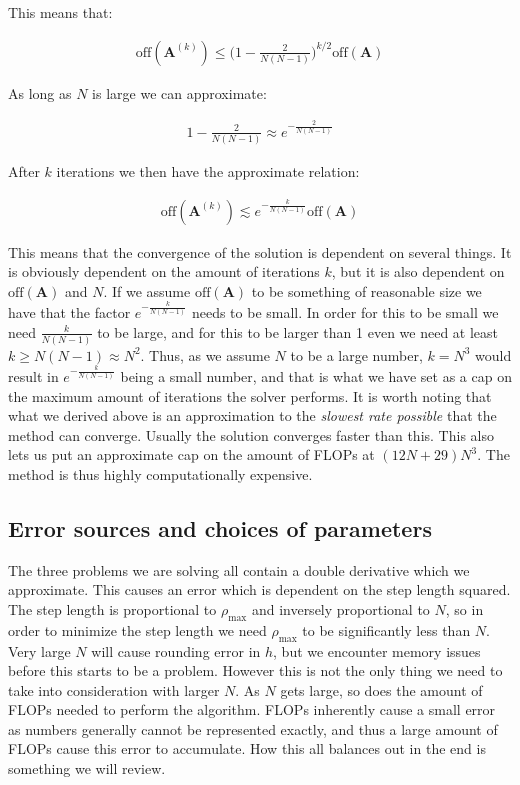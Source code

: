 \documentclass[reprint,english,notitlepage]{revtex4-1}  %
\begin{document}
This means that:

\begin{align*}
\text{off}(\textbf{A}^{(k)}) \leq \bigg(1 - \frac{2}{N(N-1)}\bigg)^{k/2} \text{off}(\textbf{A}) 
\end{align*}

As long as $N$ is large we can approximate:

\begin{align*}
1 - \frac{2}{N(N-1)} \approx e^{-\frac{2}{N(N-1)}}
\end{align*}

After $k$ iterations we then have the approximate relation:

\begin{align*}
\text{off}(\textbf{A}^{(k)}) \lesssim e^{-\frac{k}{N(N-1)}} \text{off}(\textbf{A}) 
\end{align*} 

This means that the convergence of the solution is dependent on several things. It is obviously dependent on the amount of iterations $k$, but it is also dependent on $\text{off}(\textbf{A})$ and $N$. If we assume $\text{off}(\textbf{A})$ to be something of reasonable size we have that the factor $e^{-\frac{k}{N(N-1)}}$ needs to be small. In order for this to be small we need $\frac{k}{N(N-1)}$ to be large, and for this to be larger than 1 even we need at least $k \geq N(N-1) \approx N^2$. Thus, as we assume $N$ to be a large number, $k = N^3$ would result in $e^{-\frac{k}{N(N-1)}}$ being a small number, and that is what we have set as a cap on the maximum amount of iterations the solver performs. It is worth noting that what we derived above is an approximation to the \textit{slowest rate possible} that the method can converge. Usually the solution converges faster than this. This also lets us put an approximate cap on the amount of FLOPs at $(12N + 29)N^3$. The method is thus highly computationally expensive. 


\subsection{Error sources and choices of parameters} \label{sec:III:b}

The three problems we are solving all contain a double derivative which we approximate. This causes an error which is dependent on the step length squared. The step length is proportional to $\rho_\text{max}$ and inversely proportional to $N$, so in order to minimize the step length we need $\rho_\text{max}$ to be significantly less than $N$. Very large $N$ will cause rounding error in $h$, but we encounter memory issues before this starts to be a problem. However this is not the only thing we need to take into consideration with larger $N$. As $N$ gets large, so does the amount of FLOPs needed to perform the algorithm. FLOPs inherently cause a small error as numbers generally cannot be represented exactly, and thus a large amount of FLOPs cause this error to accumulate. How this all balances out in the end is something we will review.
\end{document}
